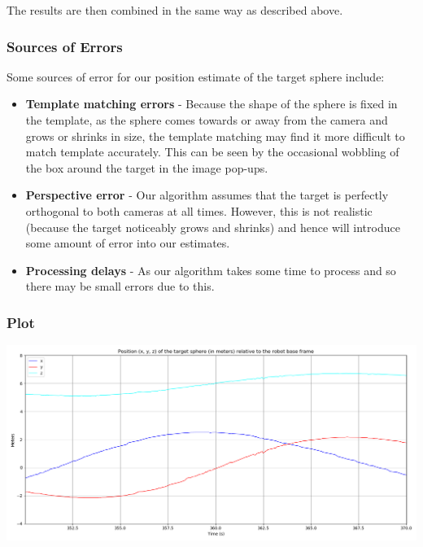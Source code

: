 \documentclass[11pt]{article}
\begin{document}
The results are then combined in the same way as described above.

\subsubsection{Sources of Errors}

Some sources of error for our position estimate of the target sphere include:
\begin{itemize}
	\item \textbf{Template matching errors} - Because the shape of the sphere is fixed in the template, as the sphere comes towards or away from the camera and grows or shrinks in size, the template matching may find it more difficult to match template accurately. This can be seen by the occasional wobbling of the box around the target in the image pop-ups.
	\item \textbf{Perspective error} - Our algorithm assumes that the target is perfectly orthogonal to both cameras at all times. However, this is not realistic (because the target noticeably grows and shrinks) and hence will introduce some amount of error into our estimates.
	\item \textbf{Processing delays} - As our algorithm takes some time to process and so there may be small errors due to this.
\end{itemize}

\subsubsection{Plot}

\begin{center}
	\includegraphics[scale=0.5]{target-sphere}
\end{center}
\end{document}
